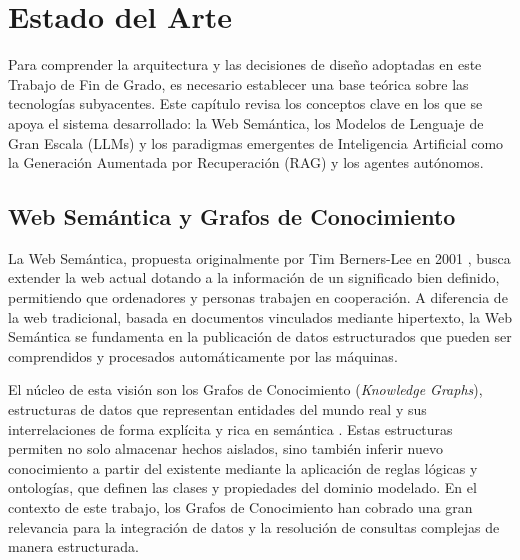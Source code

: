 
\chapter{Estado del Arte}
\label{cap:estado_arte}

Para comprender la arquitectura y las decisiones de diseño adoptadas en este Trabajo de Fin de Grado, es necesario establecer una base teórica sobre las tecnologías subyacentes. Este capítulo revisa los conceptos clave en los que se apoya el sistema desarrollado: la Web Semántica, los Modelos de Lenguaje de Gran Escala (LLMs) y los paradigmas emergentes de Inteligencia Artificial como la Generación Aumentada por Recuperación (RAG) y los agentes autónomos.

\section{Web Semántica y Grafos de Conocimiento}

La Web Semántica, propuesta originalmente por Tim Berners-Lee en 2001 \cite{berners2001semantic}, busca extender la web actual dotando a la información de un significado bien definido, permitiendo que ordenadores y personas trabajen en cooperación. A diferencia de la web tradicional, basada en documentos vinculados mediante hipertexto, la Web Semántica se fundamenta en la publicación de datos estructurados que pueden ser comprendidos y procesados automáticamente por las máquinas.

El núcleo de esta visión son los Grafos de Conocimiento (\textit{Knowledge Graphs}), estructuras de datos que representan entidades del mundo real y sus interrelaciones de forma explícita y rica en semántica \cite{hogan2021knowledge}. Estas estructuras permiten no solo almacenar hechos aislados, sino también inferir nuevo conocimiento a partir del existente mediante la aplicación de reglas lógicas y ontologías, que definen las clases y propiedades del dominio modelado. En el contexto de este trabajo, los Grafos de Conocimiento han cobrado una gran relevancia para la integración de datos y la resolución de consultas complejas de manera estructurada.

